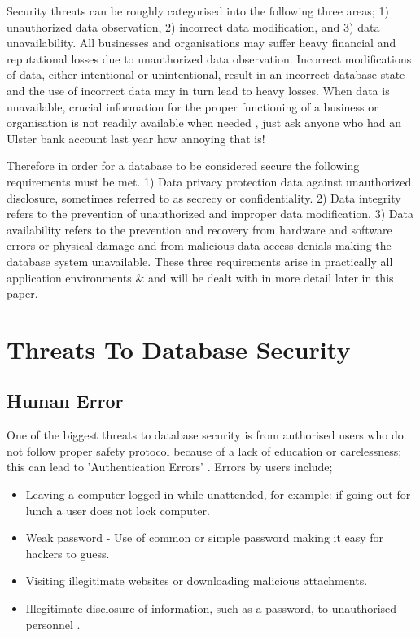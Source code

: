 \documentclass[11pt, twocolumn]{article}
\begin{document}
Security threats can be roughly categorised into the following three areas; 1) unauthorized data observation, 2) incorrect data modification, and 3) data unavailability.  All businesses and organisations may suffer heavy financial and reputational losses due to unauthorized data observation. Incorrect modifications of data, either intentional or unintentional, result in an incorrect database state and the use of incorrect data may in turn lead to heavy losses.  When data is unavailable, crucial information for the proper functioning of a business or organisation is not readily available when needed \cite{BerSand}, just ask anyone who had an Ulster bank account last year how annoying that is!  

Therefore in order for a database to be considered secure the following requirements must be met.  1) Data privacy protection data against unauthorized disclosure, sometimes referred to as secrecy or confidentiality.  2) Data integrity refers to the prevention of unauthorized and improper data modification.  3) Data availability refers to the prevention and recovery from hardware and software errors or physical damage and from malicious data access denials making the database system unavailable. These three requirements arise in practically all application environments \cite{BerSand}\&\cite{Thur} and will be dealt with in more detail later in this paper.

\section{Threats To Database Security}
\subsection{Human Error}
One of the biggest threats to database security is from authorised users who do not follow proper safety protocol because of a lack of education or carelessness; this can lead to 'Authentication Errors' \cite{Thur}.  Errors by users include;

\begin{itemize}
\item Leaving a computer logged in while unattended, for example: if going out for lunch a user does not lock computer.
\item Weak password - Use of common or simple password making it easy for hackers to guess.
\item Visiting illegitimate websites or downloading malicious attachments.
\item Illegitimate disclosure of information, such as a password, to unauthorised personnel \cite{Bas}.
\end{itemize}
\end{document}
